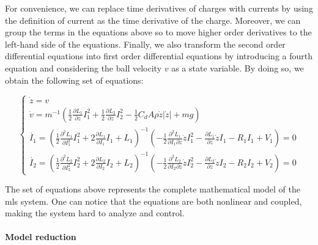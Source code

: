 For convenience, we can replace time derivatives of charges with currents by using the definition of current as the time derivative of the charge.
Moreover, we can group the terms in the equations above so to move higher order derivatives to the left-hand side of the equations.
Finally, we also transform the second order differential equations into first order differential equations by introducing a fourth equation and considering the ball velocity $v$ as a state variable.
By doing so, we obtain the following set of equations:

\begin{equation}
    \begin{cases}
        \dot{z} = v                                                                                                                                                                                                                                                                                       \\
        \dot{v} = m^{-1} \left(\frac{1}{2} \frac{\partial L_1}{\partial z} I_1^2 + \frac{1}{2} \frac{\partial L_2}{\partial z} I_2^2 - \frac{1}{2} C_d A \rho \dot{z} |\dot{z}| + m g  \right)                                                                                                            \\

        \dot{I_1} = \left( \frac{1}{2} \frac{\partial^2 L_1}{\partial I_1^2} I_1^2 + 2\frac{\partial L_1}{\partial I_1} I_1 + L_1 \right)^{-1} \left( -\frac{1}{2} \frac{\partial^2 L_1}{\partial I_1 \partial z} \dot{z} I_1^2 - \frac{\partial L_1}{\partial z} \dot{z} I_1 - R_1 I_1 + V_1 \right) = 0 \\
        \dot{I_2} = \left( \frac{1}{2} \frac{\partial^2 L_2}{\partial I_2^2} I_2^2 + 2\frac{\partial L_2}{\partial I_2} I_2 + L_2 \right)^{-1} \left( -\frac{1}{2} \frac{\partial^2 L_2}{\partial I_2 \partial z} \dot{z} I_2^2 - \frac{\partial L_2}{\partial z} \dot{z} I_2 - R_2 I_2 + V_2 \right) = 0
    \end{cases}
    \label{eq:equations_of_motion_full}
\end{equation}

The set of equations above represents the complete mathematical model of the \acrshort{mls} system.
One can notice that the equations are both nonlinear and coupled, making the system hard to analyze and control.

\paragraph{Model reduction}

